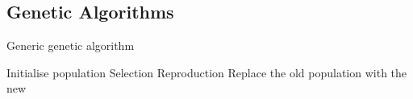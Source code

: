 \subsection{Genetic Algorithms}

\begin{algorithm}[H]
    \caption{Generic genetic algorithm}
    \begin{algorithmic}

    \State Initialise population
        \State Selection 
        \State Reproduction 
        \State Replace the old population with the new
    \EndWhile
\EndProcedure

\end{algorithmic}
\end{algorithm}

